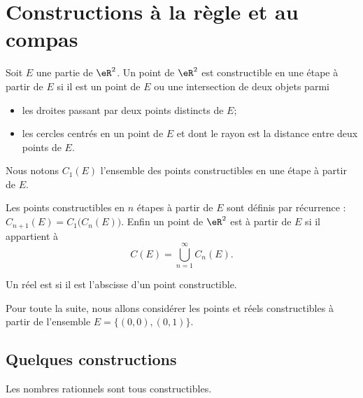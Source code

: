 \section{Constructions à la règle et au compas}

\begin{definition}
	Soit \( E\) une partie de \( \eR^2\). Un point de \( \eR^2\) est constructible en une étape à partir de \( E\) si il est un point de \( E\) ou une intersection de deux objets parmi
	\begin{itemize}
		\item les droites passant par deux points distincts de \( E\);
		\item les cercles centrés en un point de \( E\) et dont le rayon est la distance entre deux points de \( E\).
	\end{itemize}
	Nous notons \( C_1(E)\) l'ensemble des points constructibles en une étape à partir de \( E\).

	Les points constructibles en \( n\) étapes à partir de \( E\) sont définis par récurrence : \( C_{n+1}(E)=C_1\big( C_n(E) \big)\). Enfin un point de \( \eR^2\) est  à partir de \( E\) si il appartient à
	\begin{equation}
		C(E)=\bigcup_{n=1}^{\infty}C_n(E).
	\end{equation}

	Un réel est  si il est l'abscisse d'un point constructible.
\end{definition}
Pour toute la suite, nous allons considérer les points et réels constructibles à partir de l'ensemble \( E=\{ (0,0),(0,1) \}\).

\subsection{Quelques constructions}

\begin{proposition}  \label{PropIMFooDWAyoH}
	Les nombres rationnels sont tous constructibles.
\end{proposition}

